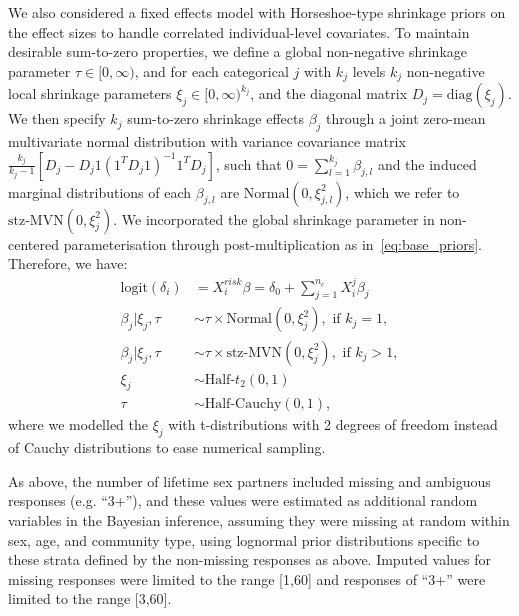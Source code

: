 \documentclass[10pt,letterpaper]{article}
\begin{document}
We also considered a fixed effects model with Horseshoe-type shrinkage priors \cite{carvalho2009, piironen2017} on the effect sizes to handle correlated individual-level covariates. To maintain desirable sum-to-zero properties, we define a global non-negative shrinkage parameter $\tau \in [0,\infty)$, and for each categorical $j$ with $k_j$ levels $k_j$ non-negative local shrinkage parameters $\xi_{j}\in [0,\infty)^{k_j}$, and the diagonal matrix $D_j = \text{diag}(\xi_{j})$. We then specify $k_j$ sum-to-zero shrinkage effects $\beta_j$ through a joint zero-mean multivariate normal distribution with variance covariance matrix $\frac{k_j}{k_j-1}[D_j - D_j1 (1^T D_j 1 )^{-1} 1^TD_j]$, such that $0=\sum_{l=1}^{k_j} \beta_{j,l}$ and the induced marginal distributions of each $\beta_{j,l}$ are $\text{Normal}(0, \xi_{j,l}^2)$, which we refer to $\text{stz-MVN}(0, \xi_j^2)$. We incorporated the global shrinkage parameter in non-centered parameterisation through post-multiplication as in~\eqref{eq:base_priors}. Therefore, we have: 
\begin{subequations}
\label{eq:delta_i_covariates_hsp}
\begin{align}
\text{logit}\left(\delta_i\right) &= X_i^{risk}\beta = \delta_0 + \sum_{j=1}^{n_c}X_i^j \beta_j\\
\beta_j | \xi_j,\tau &\sim 
  \tau \times \text{Normal}(0,\xi_j^2), \text{ if } k_j = 1,\\
\beta_j | \xi_j,\tau &\sim   \tau \times \text{stz-MVN}(0,\xi_j^2), \text{ if } k_j > 1,\\
\xi_j &\sim  \text{Half-}t_2(0, 1)\\
\tau &\sim \text{Half-Cauchy}(0,1),
\end{align}
\end{subequations}
where we modelled the $\xi_j$ with t-distributions with 2 degrees of freedom instead of Cauchy distributions to ease numerical sampling. \par
As above, the number of lifetime sex partners included missing and ambiguous responses (e.g. ``3+''), and these values were estimated as additional random variables in the Bayesian inference, assuming they were missing at random within sex, age, and community type, using lognormal prior distributions specific to these strata defined by the non-missing responses as above. Imputed values for missing responses were limited to the range [1,60] and responses of ``3+'' were limited to the range [3,60].  
\par
\end{document}
